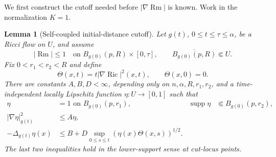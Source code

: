 \documentclass[10pt]{coll-l}
\newtheorem{lemma}[theorem]{Lemma}
\theoremstyle{definition}
\theoremstyle{remark}
\numberwithin{section}{chapter}
\numberwithin{equation}{chapter}
\newcommand{\Ric}{\operatorname{Ric}}
\newcommand{\Rm}{\operatorname{Rm}}
\begin{document}
We first construct the cutoff needed before $|\nabla\Rm|$ is known.  Work in
the normalization $K=1$.

\begin{lemma}[Self-coupled initial-distance cutoff]
\label{lem:shi-self-coupled-cutoff}
Let $g(t)$, $0\leq t\leq\tau\leq\alpha$, be a Ricci flow on $U$, and assume
\[
 |\Rm|\leq1
 \quad\text{on }B_{g(0)}(p,R)\times[0,\tau],
 \qquad \overline{B_{g(0)}(p,R)}\Subset U.
\]
Fix $0<r_1<r_2<R$ and define
\begin{equation}
             \Theta(x,t)=t|\nabla\Ric|^2(x,t),
             \qquad \Theta(x,0)=0.                       \label{eq:shi-Theta}
\end{equation}
There are constants $A,B,D<\infty$, depending only on
$n,\alpha,R,r_1,r_2$, and a time-independent locally Lipschitz function
$\eta:U\to[0,1]$ such that
\begin{align}
 \eta&=1\text{ on }B_{g(0)}(p,r_1),
 &\operatorname{supp}\eta&\Subset B_{g(0)}(p,r_2),       \label{eq:shi-cutoff-support}\\
 |\nabla\eta|_{g(t)}^2&\leq A\eta,                        \label{eq:shi-cutoff-gradient}\\
 -\Delta_{g(t)}\eta(x)&\leq
       B+D\sup_{0\leq s\leq t}
             (\eta(x)\Theta(x,s))^{1/2}.                 \label{eq:shi-cutoff-laplacian}
\end{align}
The last two inequalities hold in the lower-support sense at cut-locus
points.
\end{lemma}
\end{document}
